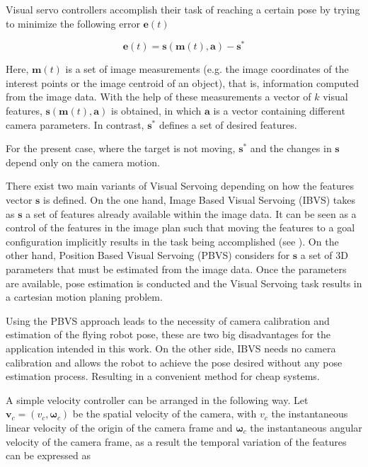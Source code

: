 
Visual servo controllers accomplish their task of reaching a certain pose by trying to minimize the following error $\bm{e}(t)$

\begin{equation}
\bm{e}(t) = \bm{s}(\bm{m}(t), \bm{a}) - \bm{s}^\ast
\label{eq:vs-th-1}
\end{equation}

Here, $\bm{m}(t)$ is a set of image measurements (e.g. the image coordinates of the interest points or the image centroid of an object), that is, information computed from the image data. With the help of these measurements a vector of $k$ visual features, $\bm{s}(\bm{m}(t), \bm{a})$ is obtained, in which $\bm{a}$ is a vector containing different camera parameters. In contrast, $\bm{s}^\ast$ defines a set of desired features.

For the present case, where the target is not moving,  $\bm{s}^\ast$ and the changes in $\bm{s}$ depend only on the camera motion.

There exist two main variants of Visual Servoing depending on how the features vector $\bm{s}$ is defined. On the one hand, Image Based Visual Servoing (IBVS) takes as $\bm{s}$ a set of features already available within the image data. It can be seen as a control of the features in the image plan such that moving the features to a goal configuration implicitly results in the task being accomplished (see \cite{espiau_1992}). On the other hand, Position Based Visual Servoing (PBVS) considers for $\bm{s}$ a set of 3D parameters that must be estimated from the image data. Once the parameters are available, pose estimation is conducted and the Visual Servoing task results in a cartesian motion planing problem.


Using the PBVS approach leads to the necessity of camera calibration and estimation of the flying robot pose, these are two big disadvantages for the application intended in this work. On the other side, IBVS needs no camera calibration and allows the robot to achieve the pose desired without any pose estimation process. Resulting in a convenient method for cheap systems.

A simple velocity controller can be arranged in the following way. Let $\bm{v}_c = (v_c, \bm{\omega}_c)$ be the spatial velocity of the camera, with $v_c$ the instantaneous linear velocity of the origin of the camera frame and $\bm{\omega}_c$ the instantaneous angular velocity of the camera frame, as a result the temporal variation of the features can be expressed as

